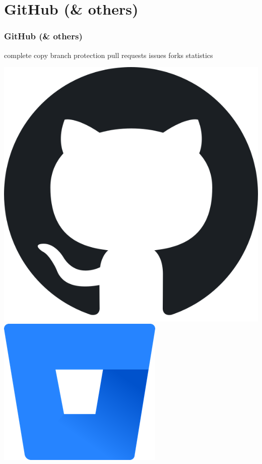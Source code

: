 \documentclass{beamer}
\begin{document}
	\section{GitHub (\& others)}
	\begin{frame}
		\frametitle{GitHub (\& others)}\pause
		
		\begin{minipage}{0.4\textwidth} 
				complete copy \newline\newline
				branch protection \newline\newline
				pull requests \newline\newline
				issues \newline
				forks \newline
				statistics \newline
		\end{minipage}
		\hfill
		\begin{minipage}{0.4\textwidth}
		\includegraphics[width=.725\linewidth]{images/githublogo.png}\newline
		\includegraphics[width=.725\linewidth]{images/bitbucketlogo.png}\newline
		\label{Bild} 
		\end{minipage}
		
	\end{frame}
\end{document}
